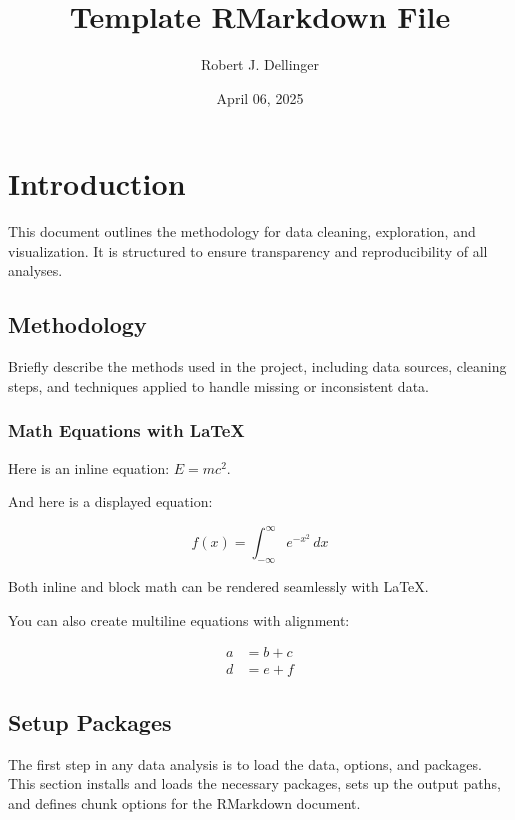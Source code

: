 \documentclass[
  12pt,
]{article}
\title{Template RMarkdown File}
\author{Robert J. Dellinger}
\date{April 06, 2025}
\begin{document}
\maketitle

{
\setcounter{tocdepth}{3}
\tableofcontents
}
\newpage

\section{Introduction}\label{introduction}

This document outlines the methodology for data cleaning, exploration,
and visualization. It is structured to ensure transparency and
reproducibility of all analyses.

\subsection{Methodology}\label{methodology}

Briefly describe the methods used in the project, including data
sources, cleaning steps, and techniques applied to handle missing or
inconsistent data.

\subsubsection{Math Equations with
LaTeX}\label{math-equations-with-latex}

Here is an inline equation: \(E = mc^2\).

And here is a displayed equation:

\[
f(x) = \int_{-\infty}^{\infty} e^{-x^2} \, dx
\]

Both inline and block math can be rendered seamlessly with LaTeX.

You can also create multiline equations with alignment:

\[
\begin{aligned}
a &= b + c \\
d &= e + f
\end{aligned}
\]

\subsection{Setup Packages}\label{setup-packages}

The first step in any data analysis is to load the data, options, and
packages. This section installs and loads the necessary packages, sets
up the output paths, and defines chunk options for the RMarkdown
document.
\end{document}
